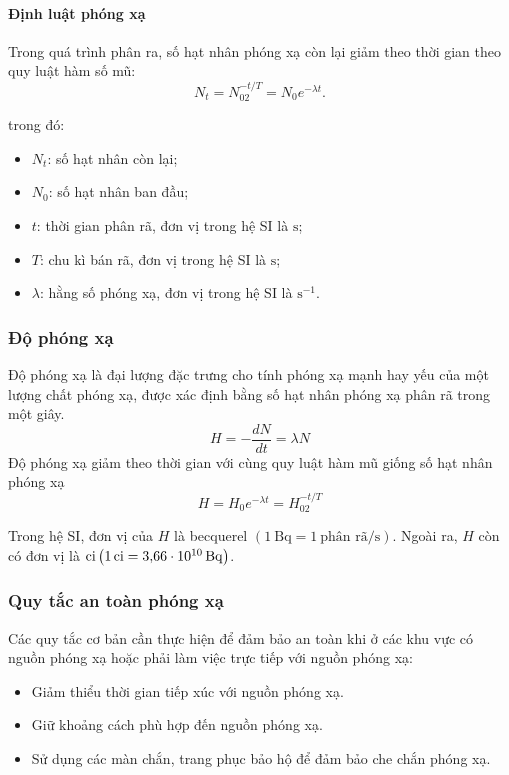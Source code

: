\begin{tomtat}
	\paragraph{Định luật phóng xạ}
	\begin{dl}
		Trong quá trình phân ra, số hạt nhân phóng xạ còn lại giảm theo thời gian theo quy luật hàm số mũ:
		\begin{equation}
			N_t=N_02^{-t/T}=N_0e^{-\lambda t}.
		\end{equation}
	\end{dl}
	trong đó:
	\begin{itemize}
		\item $N_t$: số hạt nhân còn lại;
		\item $N_0$: số hạt nhân ban đầu;
		\item $t$: thời gian phân rã, đơn vị trong hệ SI là $\si{\second}$;
		\item $T$: chu kì bán rã, đơn vị trong hệ SI là $\si{\second}$;
		\item $\lambda$: hằng số phóng xạ, đơn vị trong hệ SI là $\si{\second^{-1}}$. 
	\end{itemize}
	\subsubsection{Độ phóng xạ}
	\begin{dn}
		Độ phóng xạ là đại lượng đặc trưng cho tính phóng xạ mạnh hay yếu của một lượng chất phóng xạ, được xác định bằng số hạt nhân phóng xạ phân rã trong một giây.
		\begin{equation}
			H=-\dfrac{dN}{dt}=\lambda N
		\end{equation}
		Độ phóng xạ giảm theo thời gian với cùng quy luật hàm mũ giống số hạt nhân phóng xạ
		\begin{equation}
			H=H_0e^{-\lambda t}=H_02^{-t/T}
		\end{equation}
	\end{dn}
	Trong hệ SI, đơn vị của $H$ là becquerel $\left(\SI{1}{\becquerel}=\SI{1}{\text{phân rã}/\second}\right)$. Ngoài ra, $H$ còn có đơn vị là $\si{ci} \left(\SI{1}{ci}=\SI{3.66E10}{\becquerel}\right)$.
	\subsubsection{Quy tắc an toàn phóng xạ}
	Các quy tắc cơ bản cần thực hiện để đảm bảo an toàn khi ở các khu vực có nguồn phóng xạ hoặc phải làm việc trực tiếp với nguồn phóng xạ:
	\begin{itemize}
		\item Giảm thiểu thời gian tiếp xúc với nguồn phóng xạ.
		\item Giữ khoảng cách phù hợp đến nguồn phóng xạ.
		\item Sử dụng các màn chắn, trang phục bảo hộ để đảm bảo che chắn phóng xạ.
	\end{itemize}
\end{tomtat}
